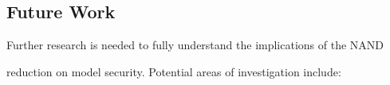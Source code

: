 \documentclass[11pt]{article}
\theoremstyle{definition}
\begin{document}
\subsection{Future Work}













Further research is needed to fully understand the implications of the NAND






reduction on model security. Potential areas of investigation include:
\end{document}
